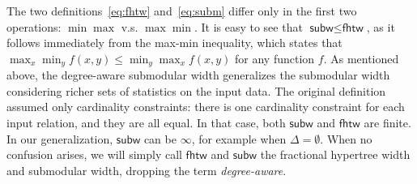 \documentclass{theoretics}
\newcommand{\fhtw}{\textsf{fhtw}}
\newcommand{\subm}{\textsf{subw}}
\begin{document}
The two definitions~\eqref{eq:fhtw} and~\eqref{eq:subm} differ only in the first two operations:
$\min \max$ v.s. $\max \min$.
It is easy to see that $\subm \leq \fhtw$, as it follows immediately from
the max-min inequality, which states that
$\max_x\min_y f(x, y) \leq \min_y\max_x f(x, y)$
for any function $f$.
As mentioned above, the degree-aware submodular width generalizes the submodular
width considering richer sets of statistics on the input data.  The original
definition assumed only cardinality constraints: there is one
cardinality constraint for each input relation, and they are all
equal.  In that case, both $\subm$ and $\fhtw$ are finite.  In our
generalization, $\subm$ can be $\infty$, for example when
$\Delta=\emptyset$.  When no confusion arises, we will simply call
$\fhtw$ and $\subm$ the fractional hypertree width and submodular width,
dropping the term {\em degree-aware}.
\end{document}
